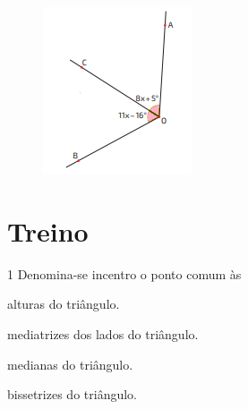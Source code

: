 \begin{minipage}{.3\textwidth}
\begin{figure}[H]
\includegraphics[width=\textwidth]{./imgSAEB_8_MAT/media/image34.png}
\end{figure}
\end{minipage}
\begin{minipage}{.6\textwidth}


\end{minipage}

\section*{Treino}

\num{1} Denomina-se incentro o ponto comum às

\begin{escolha}[itemsep=0pt]
\item alturas do triângulo.
\item mediatrizes dos lados do triângulo.
\item medianas do triângulo.
\item bissetrizes do triângulo. 
\end{escolha}

